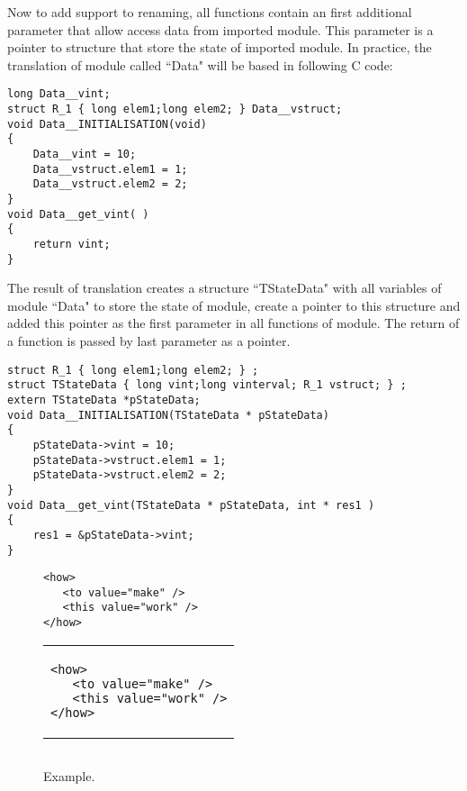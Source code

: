 \documentclass{article}
\begin{document}
Now to add support to renaming, all functions contain an first additional
parameter that allow access data from imported module. This parameter
is a pointer to structure that store the state of imported module.
In practice, the translation of module called ``Data" will be based in following
C code:
\begin{verbatim}
long Data__vint;
struct R_1 { long elem1;long elem2; } Data__vstruct;
void Data__INITIALISATION(void)
{
    Data__vint = 10;
    Data__vstruct.elem1 = 1;
    Data__vstruct.elem2 = 2;
}
void Data__get_vint( )
{
    return vint;
}

\end{verbatim}
The result of translation creates a structure ``TStateData" with all
variables of  module ``Data" to store the state of module, create a pointer
to this structure and added this pointer as the first parameter in all functions of module.
The return of a function is passed by last parameter as a pointer.
\begin{verbatim}
struct R_1 { long elem1;long elem2; } ;  
struct TStateData { long vint;long vinterval; R_1 vstruct; } ;
extern TStateData *pStateData; 
void Data__INITIALISATION(TStateData * pStateData)
{
    pStateData->vint = 10;
    pStateData->vstruct.elem1 = 1;
    pStateData->vstruct.elem2 = 2;
}
void Data__get_vint(TStateData * pStateData, int * res1 )
{
    res1 = &pStateData->vint;
}

\end{verbatim}


\begin{figure}[ht]

\begin{minipage}{50in}
\begin{verbatim}
<how>
   <to value="make" />
   <this value="work" />
</how>
\end{verbatim}
\end{minipage}


\begin{tabular}[t]{l}
\begin{minipage}{50in}
\begin{verbatim}
<how>
   <to value="make" />
   <this value="work" />
</how>
\end{verbatim}
\end{minipage}
\end{tabular}

\begin{tabular}[t]{l}

\end{tabular}

 
\caption{Example.}
\label{fig:kjdsldkjsa}
\end{figure}
\end{document}
